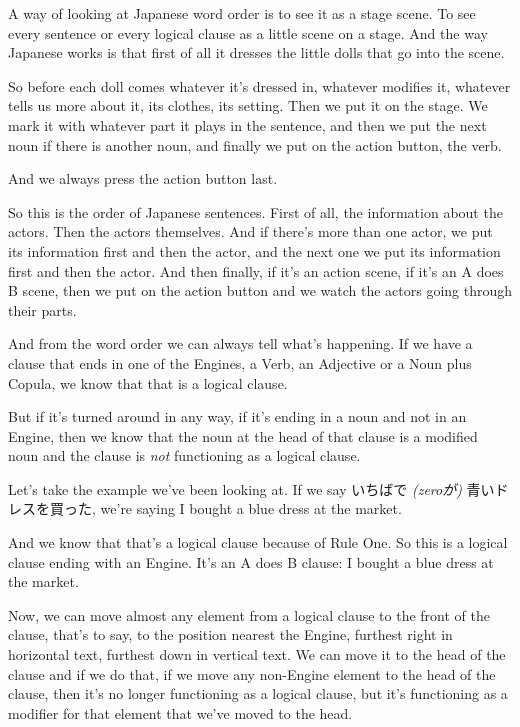 A way of looking at Japanese word order is to see it as a stage scene. To see every sentence or every logical clause as a little scene on a stage. And the way Japanese works is that first of all it dresses the little dolls that go into the scene.

So before each doll comes whatever it's dressed in, whatever modifies it, whatever tells us more about it, its clothes, its setting. Then we put it on the stage. We mark it with whatever part it plays in the sentence, and then we put the next noun if there is another noun, and finally we put on the action button, the verb.

And we always press the action button last.

{}

So this is the order of Japanese sentences. First of all, the information about the actors. Then the actors themselves. And if there's more than one actor, we put its information first and then the actor, and the next one we put its information first and then the actor. And then finally, if it's an action scene, if it's an A does B scene, then we put on the action button and we watch the actors going through their parts.

And from the word order we can always tell what's happening. If we have a clause that ends in one of the Engines, a Verb, an Adjective or a Noun plus Copula, we know that that is a logical clause.

{}

But if it's turned around in any way, if it's ending in a noun and not in an Engine, then we know that the noun at the head of that clause is a modified noun and the clause is {\em not} functioning as a logical clause.

Let's take the example we've been looking at. If we say いちばで {\em (zeroが)} 青いドレスを買った, we're saying I bought a blue dress at the market.

{}

And we know that that's a logical clause because of Rule One. So this is a logical clause ending with an Engine. It's an A does B clause: I bought a blue dress at the market.

Now, we can move almost any element from a logical clause to the front of the clause, that's to say, to the position nearest the Engine, furthest right in horizontal text, furthest down in vertical text. We can move it to the head of the clause and if we do that, if we move any non-Engine element to the head of the clause, then it's no longer functioning as a logical clause, but it's functioning as a modifier for that element that we've moved to the head.

